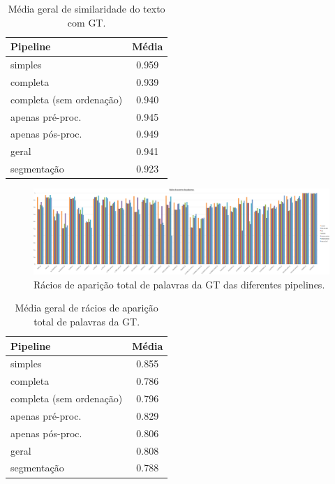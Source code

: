 \begin{table}[H]
	\centering
	\small
	\begin{tabular}{|l|c|}
		\hline
		\textbf{Pipeline} & \textbf{Média} \\ \hline
		simples & 0.959 				   \\ \hline
		completa & 0.939 				   \\ \hline
		completa (sem ordenação) & 0.940   \\ \hline
		apenas pré-proc. & 0.945 		   \\ \hline
		apenas pós-proc. & 0.949 		   \\ \hline
		geral & 0.941 					   \\ \hline
		segmentação & 0.923 			   \\ \hline
	\end{tabular}
	\caption{Média geral de similaridade do texto com GT.}
\end{table}



\begin{figure}[H]
	\centering
	\hspace*{-2cm}
	\includegraphics[width=1.25\textwidth]{images/resultados/graph_gt_word_hit_ratio.png}
	\caption{Rácios de aparição total de palavras da GT das diferentes pipelines.}
	\label{fig:graph_gt_word_hit_ratio}
\end{figure}


\begin{table}[H]
	\centering
	\small
	\begin{tabular}{|l|c|}
		\hline
		\textbf{Pipeline} & \textbf{Média} \\ \hline
		simples & 0.855 				   \\ \hline
		completa & 0.786 				   \\ \hline
		completa (sem ordenação) & 0.796   \\ \hline
		apenas pré-proc. & 0.829 		   \\ \hline
		apenas pós-proc. & 0.806 		   \\ \hline
		geral & 0.808 					   \\ \hline
		segmentação & 0.788 			   \\ \hline
	\end{tabular}
	\caption{Média geral de rácios de aparição total de palavras da GT.}
\end{table}




